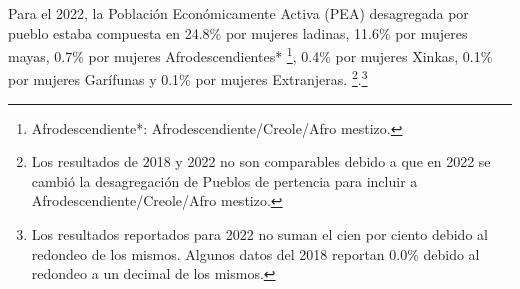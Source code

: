Para el 2022, la Población Económicamente Activa (PEA) desagregada por pueblo estaba compuesta en 24.8\% por mujeres ladinas, 11.6\% por mujeres mayas, 0.7\% por mujeres Afrodescendientes* \footnote{Afrodescendiente*: Afrodescendiente/Creole/Afro mestizo.}, 0.4\% por mujeres Xinkas, 0.1\% por mujeres Garífunas y 0.1\% por mujeres Extranjeras. \footnote{Los resultados de 2018 y 2022 no son comparables debido a que en 2022 se cambió la desagregación de Pueblos de pertencia para incluir a Afrodescendiente/Creole/Afro mestizo.}.\footnote{Los resultados reportados para 2022 no suman el cien por ciento debido al redondeo de los mismos. Algunos datos del 2018 reportan 0.0\% debido al redondeo a un decimal de los mismos.}
